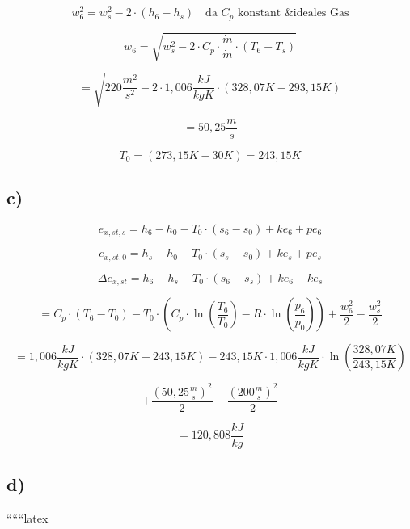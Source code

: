\begin{equation*}
w_6^2 = w_s^2 - 2 \cdot (h_6 - h_s) \quad \text{da } C_p \text{ konstant \& ideales Gas}
\end{equation*}

\begin{equation*}
w_6 = \sqrt{w_s^2 - 2 \cdot C_p \cdot \frac{\dot{m}}{\dot{m}} \cdot (T_6 - T_s)}
\end{equation*}

\begin{equation*}
= \sqrt{220 \frac{m^2}{s^2} - 2 \cdot 1,006 \frac{kJ}{kgK} \cdot (328,07K - 293,15K)}
\end{equation*}

\begin{equation*}
= 50,25 \frac{m}{s}
\end{equation*}

\begin{equation*}
T_0 = (273,15K - 30K) = 243,15K
\end{equation*}

\subsection*{c)}

\begin{equation*}
e_{x,st,s} = h_6 - h_0 - T_0 \cdot (s_6 - s_0) + ke_6 + pe_6
\end{equation*}

\begin{equation*}
e_{x,st,0} = h_s - h_0 - T_0 \cdot (s_s - s_0) + ke_s + pe_s
\end{equation*}

\begin{equation*}
\Delta e_{x,st} = h_6 - h_s - T_0 \cdot (s_6 - s_s) + ke_6 - ke_s
\end{equation*}

\begin{equation*}
= C_p \cdot (T_6 - T_0) - T_0 \cdot (C_p \cdot \ln \left( \frac{T_6}{T_0} \right) - R \cdot \ln \left( \frac{p_6}{p_0} \right)) + \frac{w_6^2}{2} - \frac{w_s^2}{2}
\end{equation*}

\begin{equation*}
= 1,006 \frac{kJ}{kgK} \cdot (328,07K - 243,15K) - 243,15K \cdot 1,006 \frac{kJ}{kgK} \cdot \ln \left( \frac{328,07K}{243,15K} \right)
\end{equation*}

\begin{equation*}
+ \frac{(50,25 \frac{m}{s})^2}{2} - \frac{(200 \frac{m}{s})^2}{2}
\end{equation*}

\begin{equation*}
= 120,808 \frac{kJ}{kg}
\end{equation*}

\subsection*{d)}

``````latex


